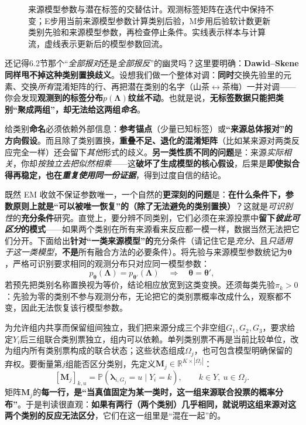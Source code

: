 \begin{figure}[!t]
  \centering
  
  \caption{来源模型参数与潜在标签的交替估计。观测标签矩阵在迭代中保持不变；E步用当前来源模型参数计算类别后验，M步用后验软计数更新类别先验和来源模型参数，再检查停止条件。实线表示样本与计算流，虚线表示更新后的模型参数回流。}
  \label{fig:knowledge-fusion-latent-label-em}
\end{figure}

还记得6.2节那个“\emph{全部报对}还是\emph{全部报反}”的幽灵吗？这里要明确：\textbf{Dawid--Skene 同样甩不掉这种类别置换歧义}。设想我们做一个整体对调：\textbf{同时}交换先验里的元素、交换\emph{所有}混淆矩阵的行、再把潜在类别的名字（山茶$\leftrightarrow$茶梅）一并对调——你会发现\textbf{观测到的标签分布$p(\bm{\Lambda})$纹丝不动}。也就是说，\textbf{无标签数据只能把类别“聚成两组”，却无法给这两组\emph{命名}}。

给类别\textbf{命名}必须依赖外部信息：\textbf{参考锚点}（少量已知标签）或\textbf{“来源总体报对”的方向假设}。而且除了类别置换，\textbf{重叠不足、退化的混淆矩阵}（比如某来源对两类反应完全一样）还会留下\emph{其他}形式的歧义。\textbf{另一类性质不同的问题}是：来源\emph{实际相关}，你却\emph{按独立去把似然相乘}——这\textbf{破坏了生成模型的核心假设}，后果是\textbf{即使拟合得再稳定，也在\emph{重复使用同一份证据}}，得到过度自信的结论。

既然 EM 收敛不保证参数唯一，一个自然的\textbf{更深刻的问题}是：\textbf{在什么条件下，参数原则上就是“可以被唯一恢复”的（除了无法避免的类别置换）}？这就是\emph{可识别性}的\textbf{充分条件}研究。直觉上，要分辨不同类别，它们必须在来源投票中\textbf{留下\emph{彼此可区分}的模式}——如果两个类别在所有来源看来反应都一模一样，数据当然无法把它们分开。下面给出\textbf{针对“一类来源模型”的}充分条件（请记住它是\emph{充分}、且\emph{只适用于这一类模型}，\textbf{不是}所有融合方法的必要条件）。将先验与来源模型参数统记为$\bm{\theta}$，严格可识别要求相同的观测分布只对应同一模型参数：
\[
  p_{\bm{\theta}}(\bm{\Lambda})
  =p_{\bm{\theta}'}(\bm{\Lambda})
  \quad\Longrightarrow\quad
  \bm{\theta}=\bm{\theta}',
\]
若预先把类别名称置换视为等价，结论相应放宽到这类变换。还须每类先验$\pi_k>0$：先验为零的类别不参与观测分布，无论把它的类别票概率改成什么，观察都不变，因此无法恢复该行模型参数。

\Needspace{45mm}
为允许组内共享而保留组间独立，我们把来源分成三个非空组$G_1,G_2,G_3$，要求给定$Y_i$后三组联合类别票独立，组内可以依赖。单列类别票不再是当前比较单位，改为组内所有类别票构成的联合状态；这些状态组成$\Omega_j$，也可包含模型明确保留的弃权。要衡量第$j$组能否区分类别，先定义$\bm{M}_j\in\mathbb{R}^{K\times|\Omega_j|}$：
\[
  [\bm{M}_j]_{k,u}
  =\mathbb{P}(\bm{\lambda}_{i,G_j}=u\mid Y_i=k),
  \qquad
  k\in Y,\ u\in\Omega_j.
\]
矩阵$\bm{M}_j$的\textbf{每一行，是“当真值固定为某一类时，这一组来源联合投票的概率分布”}。于是判读很直观：\textbf{如果有两行（两个类别）几乎相同，就说明这组来源对这两个类别的反应无法区分}，它们在这一组里是“混在一起”的。


